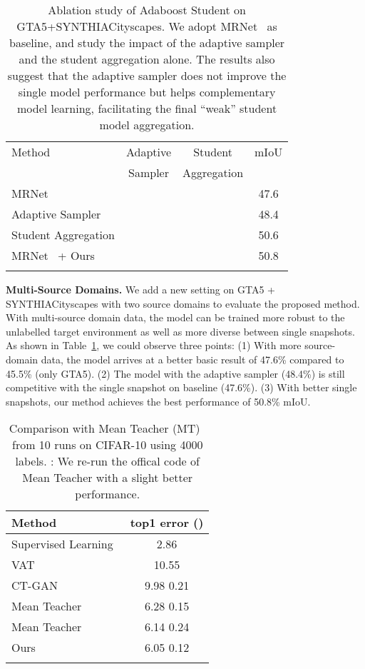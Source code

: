 \documentclass[journal]{IEEEtran}
\begin{document}
\begin{table}[t]
\caption{Ablation study of Adaboost Student on GTA5+SYNTHIACityscapes. We adopt MRNet~\cite{zheng2019unsupervised} as baseline, and study the impact of the adaptive sampler and the student aggregation alone. The results also suggest that the adaptive sampler does not improve the single model performance but helps complementary model learning, facilitating the final ``weak'' student model aggregation.
} \label{table:multi}
\vspace{-.2in}
\footnotesize
\begin{center}
{
\setlength{\tabcolsep}{3pt}
\begin{tabular}{l|c|c|c}
\shline
Method &  Adaptive & Student & mIoU \\
  & Sampler & Aggregation & \\
\hline
MRNet~\cite{zheng2019unsupervised} & & & 47.6 \\
 Adaptive Sampler  &  & & 48.4 \\
 Student Aggregation  & &  & 50.6 \\
MRNet~\cite{zheng2019unsupervised} + Ours  &  &  & 50.8 \\
\shline
\end{tabular}}
\end{center}
\end{table}

\noindent\textbf{Multi-Source Domains.} We add a new setting on  GTA5 + SYNTHIACityscapes with two source domains to evaluate the proposed method. With multi-source domain data, the model can be trained more robust to the unlabelled target environment as well as more diverse between single snapshots. As shown in Table~\ref{table:multi}, we could observe three points: (1) With more source-domain data, the model arrives at a better basic result of 47.6\% compared to 45.5\% (only GTA5). (2) The model with the adaptive sampler (48.4\%) is still competitive with the single snapshot on baseline (47.6\%).  (3) With better single snapshots, our method achieves the best performance of 50.8\% mIoU.

\setlength{\tabcolsep}{20pt}
\begin{table}[tb]
	\caption{
		Comparison with Mean Teacher (MT)~\cite{tarvainen2017mean} from 10 runs on CIFAR-10 using 4000 labels. : We re-run the offical code of Mean Teacher with a slight better performance.
	}\vspace{-.1in}
\label{table:cifar10}
\footnotesize
	\centering
	\begin{tabular}{l|c}
		\shline
		Method & top1 error () \\
		\hline
		Supervised Learning~\cite{gastaldi2017shake} & 2.86 \\ 
		\hline
		VAT~\cite{miyato2018virtual} & 10.55 \\
		CT-GAN~\cite{wei2018improving} & 9.98  0.21 \\
		Mean Teacher~\cite{tarvainen2017mean} & 6.28  0.15 \\
		Mean Teacher~\cite{tarvainen2017mean} & 6.14  0.24 \\
		Ours & 6.05  0.12 \\
		\shline
	\end{tabular}
\end{table}
\end{document}
